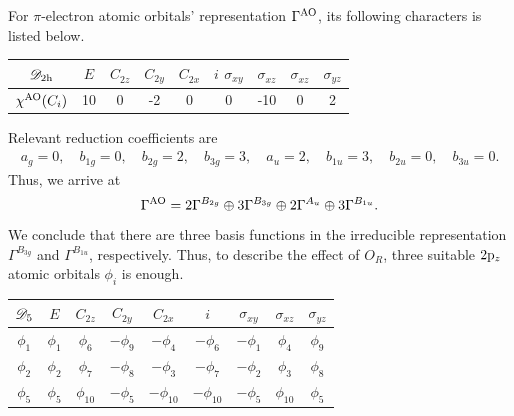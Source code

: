\documentclass[a4paper]{book}
\newcommand{\AO}{{\rm AO}}
\newcommand{\orb}[1]{{\rm #1}}
\newcommand{\orbp}{\orb{p}}
\begin{document}
\begin{solution}
\begin{enumerate}[label=(\alph*)]
		For $\pi$-electron atomic orbitals' representation $\Gamma^{\rm AO}$, its following characters is listed below.		
		\begin{center}
		\setlength{\abovecaptionskip}{-0.3em}
		\begin{tabular}{ccccccccc}\hline
	$\mathscr{D}_{\rm 2h}$	& $E$ & $C_{2z}$ &	$C_{2y}$	& $C_{2x}$	&	$i$	$\sigma_{xy}$	&	$\sigma_{xz}$	&	$\sigma_{xz}$ &	$\sigma_{yz}$  \\ \hline
	$\chi^{\AO}(C_i)$	&	10	&	0	&	-2	&	0	&	0	&	-10	&	0	&	2	\\ \hline
		\end{tabular}\vspace*{-0.5em}
		\end{center}
		Relevant reduction coefficients are
		\begin{align*}
			a_g = 0,	\quad	b_{1g} = 0,	\quad	b_{2g} = 2,	\quad	b_{3g} = 3,	\quad a_u = 2,	\quad b_{1u} = 3,	\quad	b_{2u} = 0,	\quad	b_{3u} = 0.
		\end{align*}
		Thus, we arrive at
		\begin{equation*}
			\Gamma^{\AO} = 2\Gamma^{B_{2g}} \oplus 3\Gamma^{B_{3g}} \oplus 2\Gamma^{A_u} \oplus 3\Gamma^{B_{1u}}.
		\end{equation*}
		We conclude that there are three basis functions in the irreducible representation $\Gamma^{B_{3g}}$ and $\Gamma^{B_{1u}}$, respectively. Thus, to describe the effect of $O_R$, three suitable $2 \orbp_z$ atomic orbitals $\phi_i$ is enough.
		
		\begin{center}
		\setlength{\abovecaptionskip}{0em}
		\begin{tabular}{ccccccccc}\hline
	$\mathscr{D}_{\rm 5}$ & $E$ & $C_{2z}$ & $C_{2y}$ & $C_{2x}$	&	$i$	&	$\sigma_{xy}$ &	$\sigma_{xz}$	&	$\sigma_{yz}$\\ \hline
			$\phi_1$	&	$\phi_1$	&	$\phi_6$	&	$-\phi_9$	&	$-\phi_4$	&	$-\phi_6$	&	$-\phi_1$	&	$\phi_4$	&	$\phi_9$		\\
			$\phi_2$	&	$\phi_2$	&	$\phi_7$	&	$-\phi_8$	&	$-\phi_3$	&	$-\phi_7$	&	$-\phi_2$	&	$\phi_3$	&	$\phi_8$		\\ 
			$\phi_5$	&	$\phi_5$	&	$\phi_{10}$	&	$-\phi_5$	&	$-\phi_{10}$	&	$-\phi_{10}$	&	$-\phi_5$	&	$\phi_{10}$	&	$\phi_5$		\\\hline
		\end{tabular}
		\end{center}
		

\end{enumerate}
\end{solution}
\end{document}
